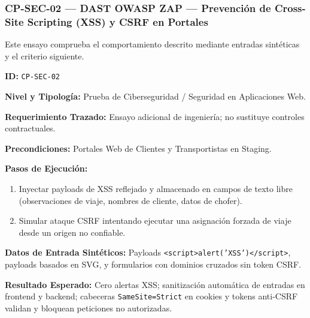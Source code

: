 \subsubsection*{CP-SEC-02 — DAST OWASP ZAP — Prevención de Cross-Site Scripting (XSS) y CSRF en Portales}\label{sec:9-cp-sec-02}
Este ensayo comprueba el comportamiento descrito mediante entradas sintéticas y el criterio siguiente.

\par\noindent\textbf{ID:} \texttt{C\allowbreak{}P\allowbreak{}-\allowbreak{}S\allowbreak{}E\allowbreak{}C\allowbreak{}-\allowbreak{}0\allowbreak{}2\allowbreak{}}\par
\par\noindent\textbf{Nivel y Tipología:} Prueba de Ciberseguridad / Seguridad en Aplicaciones Web.\par
\par\noindent\textbf{Requerimiento Trazado:} Ensayo adicional de ingeniería; no sustituye controles contractuales.\par
\par\noindent\textbf{Precondiciones:} Portales Web de Clientes y Transportistas en Staging.\par
\par\noindent\textbf{Pasos de Ejecución:} \par
\begin{enumerate}
\item Inyectar payloads de XSS reflejado y almacenado en campos de texto libre (observaciones de viaje, nombres de cliente, datos de chofer).
\item Simular ataque CSRF intentando ejecutar una asignación forzada de viaje desde un origen no confiable.
\end{enumerate}
\par\noindent\textbf{Datos de Entrada Sintéticos:} Payloads \texttt{<\allowbreak{}s\allowbreak{}c\allowbreak{}r\allowbreak{}i\allowbreak{}p\allowbreak{}t\allowbreak{}>\allowbreak{}a\allowbreak{}l\allowbreak{}e\allowbreak{}r\allowbreak{}t\allowbreak{}(\allowbreak{}'\allowbreak{}X\allowbreak{}S\allowbreak{}S\allowbreak{}'\allowbreak{})\allowbreak{}<\allowbreak{}/\allowbreak{}s\allowbreak{}c\allowbreak{}r\allowbreak{}i\allowbreak{}p\allowbreak{}t\allowbreak{}>\allowbreak{}}, payloads basados en SVG, y formularios con dominios cruzados sin token CSRF.\par
\par\noindent\textbf{Resultado Esperado:} Cero alertas XSS; sanitización automática de entradas en frontend y backend; cabeceras \texttt{S\allowbreak{}a\allowbreak{}m\allowbreak{}e\allowbreak{}S\allowbreak{}i\allowbreak{}t\allowbreak{}e\allowbreak{}=\allowbreak{}S\allowbreak{}t\allowbreak{}r\allowbreak{}i\allowbreak{}c\allowbreak{}t\allowbreak{}} en cookies y tokens anti-CSRF validan y bloquean peticiones no autorizadas.\par
